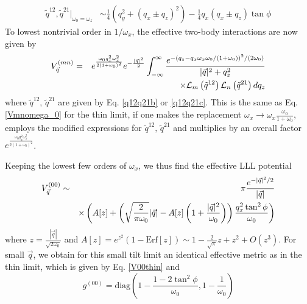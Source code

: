 \documentclass[twocolumn,showpacs,amsmath,amstex,amssymb,mathfonts,prb]{revtex4-1}
\begin{document}
\begin{align}
\tilde q^{12},\tilde q^{21}|_{\omega_0= \omega_z}&\sim \frac1{4}(q_y^2+(q_x\pm q_z)^2)-\frac1{4}q_x(q_x\pm q_z)\tan\phi
\label{q12q21c}
\end{align}
To lowest nontrivial order in $1/\omega_x$, the effective two-body interactions are now given by
\begin{eqnarray}
V^{(mn)}_{\vec q}&=&e^{\frac{\omega_0q_x^2\omega_x^2}{2(1+\omega_0)^2}}e^{-\frac{|\vec q|^2}{2}} \int_{-\infty}^\infty \frac{e^{-(q_z-q_x\omega_x\omega_0/(1+\omega_0))^2/(2\omega_0)}}{|\vec q|^2+q_z^2}\notag\\
&&\times\mathcal L_m\left(\tilde q^{12}\right)\mathcal L_n\left(\tilde q^{21}\right)dq_z
\label{Vmnomega_b}
\end{eqnarray}
where $\tilde q^{12},\,\tilde q^{21}$ are given by Eq. \ref{q12q21b} or  \ref{q12q21c}. This is the same as Eq. \ref{Vmnomega_0} for the thin limit, if one makes the replacement $\omega_x\rightarrow \omega_x \frac{\omega_0}{1+\omega_0}$, employs the modified expressions for $\tilde q^{12},\,\tilde q^{21}$ and multiplies by an overall factor $e^{\frac{\omega_0q_x^2\omega_x^2}{2(1+\omega_0)^2}}$.

Keeping the lowest few orders of $\omega_x$, we thus find the effective LLL potential
\footnotesize
\begin{eqnarray}
V^{(00)}_{\vec q}&\sim& \pi \frac{e^{-|\vec q|^2/2}}{|\vec q|}\notag\\
&&\times\left(A[z]+\left(\sqrt{\frac{2}{\pi\omega_0}}|\vec q|-A[z]\left(1+\frac{|\vec q|^2}{\omega_0}\right)\right)\frac{q_x^2\tan^2\phi}{\omega_0}\right)\notag\\
\end{eqnarray}
\normalsize
where $z=\frac{|\vec q|}{\sqrt{2\omega_0}}$ and $A[z]=e^{z^2}(1-\text{Erf}[z])\sim 1-\frac{2}{\sqrt{\pi}}z+z^2+O(z^3)$. For small $\vec q$, we obtain for this small tilt limit an identical effective metric as in the thin limit, which is given by Eq. \ref{V00thin} and 
\[ g^{(00)}=\text{diag}\left(1-\frac{1-2\tan^2\phi}{\omega_0},1-\frac1{\omega_0}\right)\]
\end{document}
